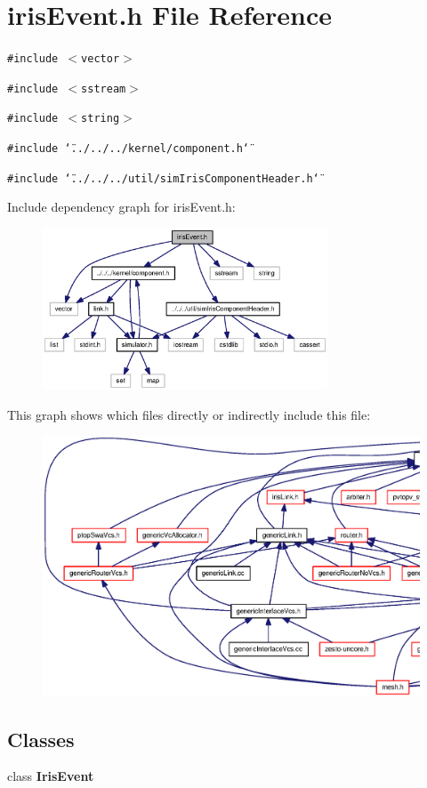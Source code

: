 \section{irisEvent.h File Reference}
\label{irisEvent_8h}
{\tt \#include $<$vector$>$}\par
{\tt \#include $<$sstream$>$}\par
{\tt \#include $<$string$>$}\par
{\tt \#include \char`\"{}../../../kernel/component.h\char`\"{}}\par
{\tt \#include \char`\"{}../../../util/simIrisComponentHeader.h\char`\"{}}\par


Include dependency graph for irisEvent.h:\nopagebreak
\begin{figure}[H]
\begin{center}
\leavevmode
\includegraphics[width=240pt]{irisEvent_8h__incl}
\end{center}
\end{figure}


This graph shows which files directly or indirectly include this file:\nopagebreak
\begin{figure}[H]
\begin{center}
\leavevmode
\includegraphics[width=420pt]{irisEvent_8h__dep__incl}
\end{center}
\end{figure}
\subsection*{Classes}
\begin{CompactItemize}
\item 
class {\bf IrisEvent}
\end{CompactItemize}
